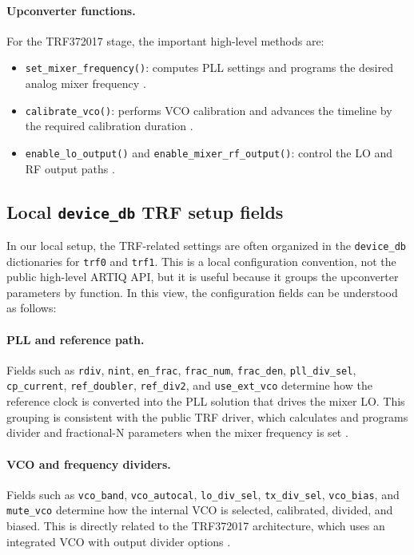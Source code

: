 \paragraph{Upconverter functions.}
For the TRF372017 stage, the important high-level methods are:
\begin{itemize}
    \item \texttt{set\_mixer\_frequency()}: computes PLL settings and programs the desired analog mixer frequency \cite{artiq_trf_module}.
    \item \texttt{calibrate\_vco()}: performs VCO calibration and advances the timeline by the required calibration duration \cite{artiq_trf_module}.
    \item \texttt{enable\_lo\_output()} and \texttt{enable\_mixer\_rf\_output()}: control the LO and RF output paths \cite{artiq_trf_module}.
\end{itemize}

\subsection{Local \texttt{device\_db} TRF setup fields}

In our local setup, the TRF-related settings are often organized in the \texttt{device\_db} dictionaries for \texttt{trf0} and \texttt{trf1}. This is a local configuration convention, not the public high-level ARTIQ API, but it is useful because it groups the upconverter parameters by function. In this view, the configuration fields can be understood as follows:

\paragraph{PLL and reference path.}
Fields such as \texttt{rdiv}, \texttt{nint}, \texttt{en\_frac}, \texttt{frac\_num}, \texttt{frac\_den}, \texttt{pll\_div\_sel}, \texttt{cp\_current}, \texttt{ref\_doubler}, \texttt{ref\_div2}, and \texttt{use\_ext\_vco} determine how the reference clock is converted into the PLL solution that drives the mixer LO. This grouping is consistent with the public TRF driver, which calculates and programs divider and fractional-N parameters when the mixer frequency is set \cite{artiq_trf_module, trf372017}.

\paragraph{VCO and frequency dividers.}
Fields such as \texttt{vco\_band}, \texttt{vco\_autocal}, \texttt{lo\_div\_sel}, \texttt{tx\_div\_sel}, \texttt{vco\_bias}, and \texttt{mute\_vco} determine how the internal VCO is selected, calibrated, divided, and biased. This is directly related to the TRF372017 architecture, which uses an integrated VCO with output divider options \cite{trf372017}.

